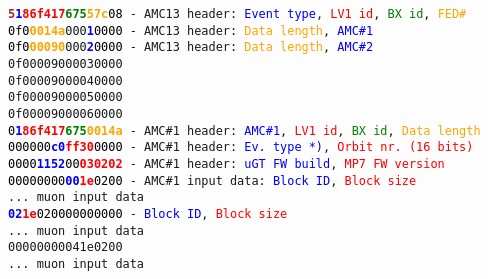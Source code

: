 \texttt{\textcolor{brown}{\textbf{5}}\textcolor{blue}{\textbf{1}}\textcolor{red}{\textbf{86f417}}\textcolor{green}{\textbf{675}}\textcolor{orange}{\textbf{57c}}\textcolor{black}{08} - AMC13 header: \textcolor{blue}{Event type}, \textcolor{red}{LV1 id}, \textcolor{green}{BX id}, \textcolor{orange}{FED\#}}\\
\texttt{\textcolor{black}{0f0}\textcolor{orange}{\textbf{0014a}}\texttt{000}\textcolor{blue}{\textbf{1}}\textcolor{black}{0000} - AMC13 header: \textcolor{orange}{Data length}, \textcolor{blue}{AMC\#1}}\\
\texttt{\textcolor{black}{0f0}\textcolor{orange}{\textbf{00090}}\texttt{000}\textcolor{blue}{\textbf{2}}\textcolor{black}{0000} - AMC13 header: \textcolor{orange}{Data length}, \textcolor{blue}{AMC\#2}}\\
\texttt{0f00009000030000}\\
\texttt{0f00009000040000}\\
\texttt{0f00009000050000}\\
\texttt{0f00009000060000}\\
\texttt{\textcolor{black}{0}\textcolor{blue}{\textbf{1}}\textcolor{red}{\textbf{86f417}}\textcolor{green}{\textbf{675}}\textcolor{orange}{\textbf{0014a}} - AMC\#1 header: \textcolor{blue}{AMC\#1}, \textcolor{red}{LV1 id}, \textcolor{green}{BX id}, \textcolor{orange}{Data length}}\\
\texttt{\textcolor{black}{000000}\textcolor{blue}{\textbf{c0}}\textcolor{red}{\textbf{ff30}}\textcolor{black}{0000} - AMC\#1 header: \textcolor{blue}{Ev. type *)}, \textcolor{red}{Orbit nr. (16 bits)}}\\
\texttt{\textcolor{black}{0000}\textcolor{blue}{\textbf{1152}}\textcolor{black}{00}\textcolor{red}{\textbf{030202}} - AMC\#1 header: \textcolor{blue}{uGT FW build}, \textcolor{red}{MP7 FW version}}\\
\texttt{\textcolor{black}{00000000}\textcolor{blue}{\textbf{00}}\textcolor{red}{\textbf{1e}}\textcolor{black}{0200} - AMC\#1 input data: \textcolor{blue}{Block ID}, \textcolor{red}{Block size}}\\
\texttt{... muon input data}\\
\texttt{\textcolor{blue}{\textbf{02}}\textcolor{red}{\textbf{1e}}\textcolor{black}{020000000000} - \textcolor{blue}{Block ID}, \textcolor{red}{Block size}}\\
\texttt{... muon input data}\\
\texttt{00000000041e0200}\\
\texttt{... muon input data}\\
